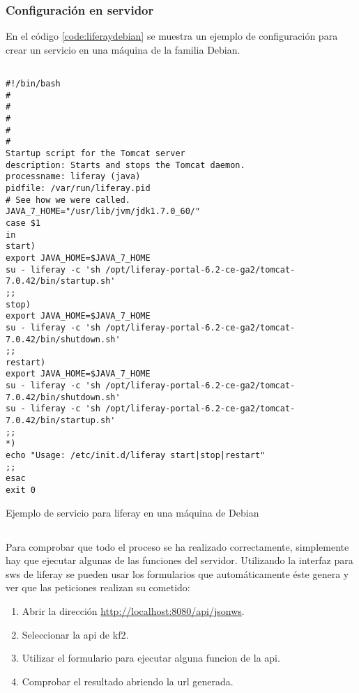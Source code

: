 \subsubsection*{Configuración en servidor}
En el código \ref{code:liferaydebian} se muestra un ejemplo de configuración para crear un servicio en una máquina de la familia Debian.

\begin{listing}[H]
    \begin{verbatim}

#!/bin/bash
#
#
#
#
#
Startup script for the Tomcat server
description: Starts and stops the Tomcat daemon.
processname: liferay (java)
pidfile: /var/run/liferay.pid
# See how we were called.
JAVA_7_HOME="/usr/lib/jvm/jdk1.7.0_60/"
case $1
in
start)
export JAVA_HOME=$JAVA_7_HOME
su - liferay -c 'sh /opt/liferay-portal-6.2-ce-ga2/tomcat-7.0.42/bin/startup.sh'
;;
stop)
export JAVA_HOME=$JAVA_7_HOME
su - liferay -c 'sh /opt/liferay-portal-6.2-ce-ga2/tomcat-7.0.42/bin/shutdown.sh'
;;
restart)
export JAVA_HOME=$JAVA_7_HOME
su - liferay -c 'sh /opt/liferay-portal-6.2-ce-ga2/tomcat-7.0.42/bin/shutdown.sh'
su - liferay -c 'sh /opt/liferay-portal-6.2-ce-ga2/tomcat-7.0.42/bin/startup.sh'
;;
*)
echo "Usage: /etc/init.d/liferay start|stop|restart"
;;
esac
exit 0
    \end{verbatim}
    \caption{Ejemplo de servicio para \gls{liferay} en una máquina de Debian}
    \label{code:liferaydebian}
\end{listing}


\subsection{}
Para comprobar que todo el proceso se ha realizado correctamente, simplemente hay que ejecutar algunas de las funciones del servidor. Utilizando la interfaz para \glspl{sw} de \gls{liferay} se pueden usar los formularios que automáticamente éste genera y ver que las peticiones realizan su cometido:
\begin{enumerate}
	\item Abrir la dirección \url{http://localhost:8080/api/jsonws}.
    \item Seleccionar la \gls{api} de \gls{kf2}.
    \item Utilizar el formulario para ejecutar alguna funcion de la \gls{api}.
    \item Comprobar el resultado abriendo la \gls{url} generada.
\end{enumerate}

